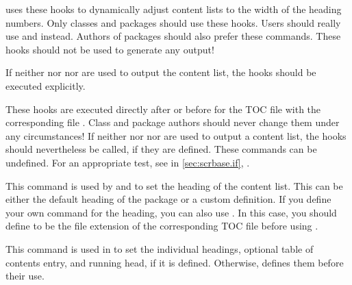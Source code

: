 \KOMAScript{} uses these hooks to dynamically adjust content lists to the
width of the heading numbers. Only classes and packages should use these
hooks. Users should really use
 and
 instead. Authors of packages should
also prefer these commands. These hooks should not be used to generate any
output!

If neither  nor
 nor  are
used to output the content list, the hooks should be executed explicitly.%
\EndIndexGroup


\begin{Declaration}
\end{Declaration}
These hooks are executed directly after
 or before
 for the TOC file with the
corresponding file . Class and package
authors should never change them under any circumstances! If
neither  nor
 nor  are
used to output a content list, the hooks should nevertheless be called, if
they are defined. These commands can be undefined. For an appropriate test,
see %
 in \autoref{sec:scrbase.if},
.%
\EndIndexGroup


\begin{Declaration}
\end{Declaration}
This command is used by  and
 to set the heading of the content list.
This can be either the default heading of the  package or a
custom definition. If you define your own command for the heading, you can
also use . In this case, you should define
 to be the file
extension of the corresponding TOC file before using
.%
\EndIndexGroup


\begin{Declaration}
\end{Declaration}
This command is used in  to set the
individual headings, optional table of contents entry, and running head, if it
is defined. Otherwise,  defines them
before their use.%
\EndIndexGroup


